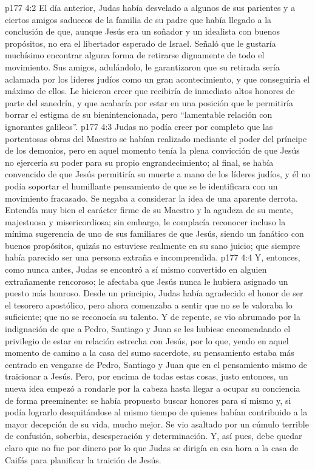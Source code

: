 \vs p177 4:2 El día anterior, Judas había desvelado a algunos de sus parientes y a ciertos amigos saduceos de la familia de su padre que había llegado a la conclusión de que, aunque Jesús era un soñador y un idealista con buenos propósitos, no era el libertador esperado de Israel. Señaló que le gustaría muchísimo encontrar alguna forma de retirarse dignamente de todo el movimiento. Sus amigos, adulándolo, le garantizaron que su retirada sería aclamada por los líderes judíos como un gran acontecimiento, y que conseguiría el máximo de ellos. Le hicieron creer que recibiría de inmediato altos honores de parte del sanedrín, y que acabaría por estar en una posición que le permitiría borrar el estigma de su bienintencionada, pero “lamentable relación con ignorantes galileos”.
\vs p177 4:3 Judas no podía creer por completo que las portentosas obras del Maestro se habían realizado mediante el poder del príncipe de los demonios, pero en aquel momento tenía la plena convicción de que Jesús no ejercería su poder para su propio engrandecimiento; al final, se había convencido de que Jesús permitiría su muerte a mano de los líderes judíos, y él no podía soportar el humillante pensamiento de que se le identificara con un movimiento fracasado. Se negaba a considerar la idea de una aparente derrota. Entendía muy bien el carácter firme de su Maestro y la agudeza de su mente, majestuosa y misericordiosa; sin embargo, le complacía reconocer incluso la mínima sugerencia de uno de sus familiares de que Jesús, siendo un fanático con buenos propósitos, quizás no estuviese realmente en su sano juicio; que siempre había parecido ser una persona extraña e incomprendida.
\vs p177 4:4 Y, entonces, como nunca antes, Judas se encontró a sí mismo convertido en alguien extrañamente rencoroso; le afectaba que Jesús nunca le hubiera asignado un puesto más honroso. Desde un principio, Judas había agradecido el honor de ser el tesorero apostólico, pero ahora comenzaba a sentir que no se le valoraba lo suficiente; que no se reconocía su talento. Y de repente, se vio abrumado por la indignación de que a Pedro, Santiago y Juan se les hubiese encomendando el privilegio de estar en relación estrecha con Jesús, por lo que, yendo en aquel momento de camino a la casa del sumo sacerdote, su pensamiento estaba más centrado en vengarse de Pedro, Santiago y Juan que en el pensamiento mismo de traicionar a Jesús. Pero, por encima de todas estas cosas, justo entonces, un nueva idea empezó a rondarle por la cabeza hasta llegar a ocupar su conciencia de forma preeminente: se había propuesto buscar honores para sí mismo y, si podía lograrlo desquitándose al mismo tiempo de quienes habían contribuido a la mayor decepción de su vida, mucho mejor. Se vio asaltado por un cúmulo terrible de confusión, soberbia, desesperación y determinación. Y, así pues, debe quedar claro que no fue por dinero por lo que Judas se dirigía en esa hora a la casa de Caifás para planificar la traición de Jesús.
